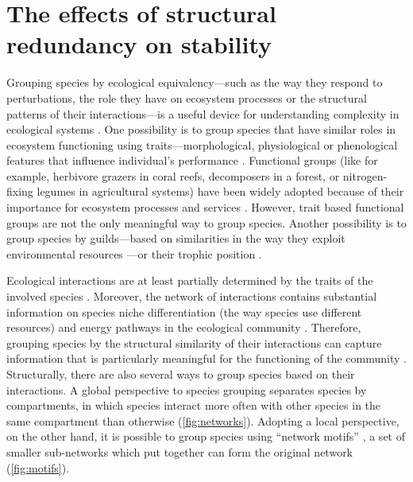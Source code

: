 \documentclass[a4paper]{article}
\begin{document}
\section{The effects of structural redundancy on stability}

Grouping species by ecological equivalency---such as the way they respond to perturbations, the role they have on ecosystem processes or the structural patterns of their interactions---is a useful device for understanding complexity in ecological systems \autocite{Naeem1998}.
One possibility is to group species that have similar roles in ecosystem functioning using traits---morphological, physiological or phenological features that influence individual's performance \autocite{Raunkiaer1934, Fonseca2001, Mouillot2013}.
Functional groups (like for example, herbivore grazers in coral reefs, decomposers in a forest, or nitrogen-fixing legumes in agricultural systems) have been widely adopted because of their importance for ecosystem processes and services \autocite{Daz2001, Tilman2001a, Wardle2005}.
However, trait based functional groups are not the only meaningful way to group species.
Another possibility is to group species by guilds---based on similarities in the way they exploit environmental resources \autocite{Root1967}---or their trophic position \autocite{Hairston1960}.

Ecological interactions are at least partially determined by the traits of the involved species \autocite{Cohen1993, Stang2009, Edwards2011}.
Moreover, the network of interactions contains substantial information on species niche differentiation (the way species use different resources) and energy pathways in the ecological community \autocite{Gauzens2014}.
Therefore, grouping species by the structural similarity of their interactions can capture information that is particularly meaningful for the functioning of the community \autocite{Thebault2010, Stouffer2011}.
Structurally, there are also several ways to group species based on their interactions.
A global perspective to species grouping separates species by compartments, in which species interact more often with other species in the same compartment than otherwise (\autoref{fig:networks}).
Adopting a local perspective, on the other hand, it is possible to group species using ``network motifs'' \autocite{Holt2001, Milo2002, Stouffer2007a}, a set of smaller sub-networks which put together can form the original network (\autoref{fig:motifs}).
\end{document}
